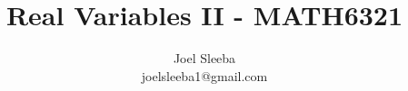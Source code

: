 \documentclass[12pt]{report}
\theoremstyle{plain} %
\theoremstyle{definition} %
\theoremstyle{remark} %
\begin{document}
\title{Real Variables II - MATH6321}


\author{
  Joel Sleeba \\
  joelsleeba1@gmail.com \\
}

\maketitle

 \setcounter{page}{2}
\tableofcontents
{} \setcounter{page}{1}













\printbibliography[heading=bibintoc]
\end{document}
